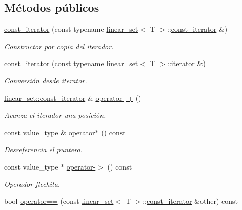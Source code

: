 \subsection*{Métodos públicos}
\begin{DoxyCompactItemize}
\item 
\hyperlink{classlinear__set_1_1const__iterator_a14ea693ec9b2c14b9d0e4570718236cc}{const\-\_\-iterator} (const typename \hyperlink{classlinear__set}{linear\-\_\-set}$<$ T $>$\-::\hyperlink{classlinear__set_1_1const__iterator}{const\-\_\-iterator} \&)
\begin{DoxyCompactList}\small\item\em Constructor por copia del iterador. \end{DoxyCompactList}\item 
\hyperlink{classlinear__set_1_1const__iterator_af7541fcff16bc3f8b4aaa9cbfc6f4a08}{const\-\_\-iterator} (const typename \hyperlink{classlinear__set}{linear\-\_\-set}$<$ T $>$\-::\hyperlink{classlinear__set_1_1iterator}{iterator} \&)
\begin{DoxyCompactList}\small\item\em Conversión desde iterator. \end{DoxyCompactList}\item 
\hyperlink{classlinear__set_1_1const__iterator}{linear\-\_\-set\-::const\-\_\-iterator} \& \hyperlink{classlinear__set_1_1const__iterator_aae244f473a6bc213fb9cd16d5caf8b08}{operator++} ()
\begin{DoxyCompactList}\small\item\em Avanza el iterador una posición. \end{DoxyCompactList}\item 
const value\-\_\-type \& \hyperlink{classlinear__set_1_1const__iterator_a1b5ae6a04aa1932ba64d4db211f90148}{operator$\ast$} () const 
\begin{DoxyCompactList}\small\item\em Desreferencia el puntero. \end{DoxyCompactList}\item 
const value\-\_\-type $\ast$ \hyperlink{classlinear__set_1_1const__iterator_ae87d9a0975fc0204f67ae31cbc53cb99}{operator-\/$>$} () const 
\begin{DoxyCompactList}\small\item\em Operador flechita. \end{DoxyCompactList}\item 
bool \hyperlink{classlinear__set_1_1const__iterator_a8b4807ed9a81180aca7855bb1fca935c}{operator==} (const \hyperlink{classlinear__set}{linear\-\_\-set}$<$ T $>$\-::\hyperlink{classlinear__set_1_1const__iterator}{const\-\_\-iterator} \&other) const 

\end{DoxyCompactItemize}
